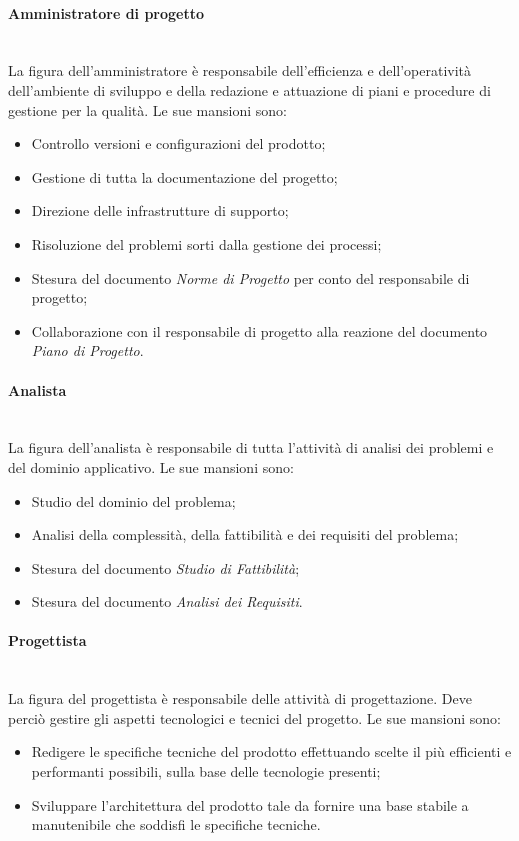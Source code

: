 			\paragraph{Amministratore di progetto}\mbox{}\\ [1mm]
				La figura dell'amministratore è responsabile dell'efficienza e dell'operatività dell'ambiente di sviluppo e della redazione e attuazione di piani e procedure di gestione per la qualità.
				Le sue mansioni sono:
				\begin{itemize}
					\item Controllo versioni e configurazioni del prodotto;
					\item Gestione di tutta la documentazione del progetto;
					\item Direzione delle infrastrutture di supporto;
					\item Risoluzione del problemi sorti dalla gestione dei processi;
					\item Stesura del documento \textit{Norme di Progetto} per conto del responsabile di progetto;
					\item Collaborazione con il responsabile di progetto alla reazione del documento \textit{Piano di Progetto}.
				\end{itemize}
			\paragraph{Analista}\mbox{}\\ [1mm]
				La figura dell'analista è responsabile di tutta l'attività di analisi dei problemi e del dominio applicativo.
				Le sue mansioni sono:
				\begin{itemize}
					\item Studio del dominio del problema;
					\item Analisi della complessità, della fattibilità e dei requisiti del problema;
					\item Stesura del documento \textit{Studio di Fattibilità};
					\item Stesura del documento \textit{Analisi dei Requisiti}.
				\end{itemize}
			\paragraph{Progettista}\mbox{}\\ [1mm]
				La figura del progettista è responsabile delle attività di progettazione. Deve perciò gestire gli aspetti tecnologici e tecnici del progetto.
				Le sue mansioni sono:
				\begin{itemize}
					\item Redigere le specifiche tecniche del prodotto effettuando scelte il più efficienti e performanti possibili, sulla base delle tecnologie presenti;
					\item Sviluppare l'architettura del prodotto tale da fornire una base stabile a manutenibile che soddisfi le specifiche tecniche.
				\end{itemize}
